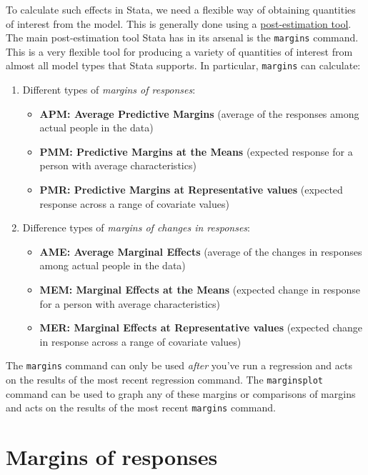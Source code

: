 \documentclass[
]{book}
\providecommand{\tightlist}{%
  \setlength{\itemsep}{0pt}\setlength{\parskip}{0pt}}
\begin{document}
To calculate such effects in Stata, we need a flexible way of obtaining quantities of interest from the model. This is generally done using a \href{https://www.stata.com/manuals13/u20.pdf}{post-estimation tool}. The main post-estimation tool Stata has in its arsenal is the \texttt{margins} command. This is a very flexible tool for producing a variety of quantities of interest from almost all model types that Stata supports. In particular, \texttt{margins} can calculate:

\begin{enumerate}
\def\labelenumi{\arabic{enumi}.}
\tightlist
\item
  Different types of \emph{margins of responses}:

  \begin{itemize}
  \tightlist
  \item
    \textbf{APM: Average Predictive Margins} (average of the responses among actual people in the data)
  \item
    \textbf{PMM: Predictive Margins at the Means} (expected response for a person with average characteristics)
  \item
    \textbf{PMR: Predictive Margins at Representative values} (expected response across a range of covariate values)
  \end{itemize}
\item
  Difference types of \emph{margins of changes in responses}:

  \begin{itemize}
  \tightlist
  \item
    \textbf{AME: Average Marginal Effects} (average of the changes in responses among actual people in the data)
  \item
    \textbf{MEM: Marginal Effects at the Means} (expected change in response for a person with average characteristics)
  \item
    \textbf{MER: Marginal Effects at Representative values} (expected change in response across a range of covariate values)
  \end{itemize}
\end{enumerate}

The \texttt{margins} command can only be used \emph{after} you've run a regression and acts on the results of the most recent regression command. The \texttt{marginsplot} command can be used to graph any of these margins or comparisons of margins and acts on the results of the most recent \texttt{margins} command.

\hypertarget{margins-of-responses}{%
\section{Margins of responses}\label{margins-of-responses}}
\end{document}

